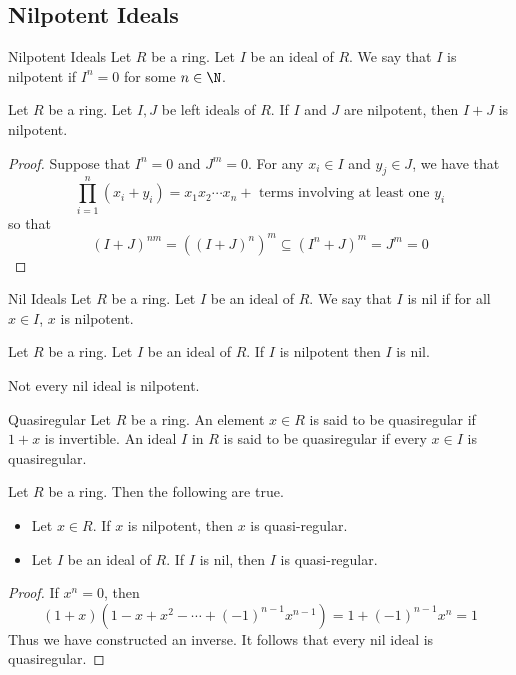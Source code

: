 \documentclass[a4paper]{article}
\begin{document}
\subsection{Nilpotent Ideals}
\begin{defn}{Nilpotent Ideals}{} Let $R$ be a ring. Let $I$ be an ideal of $R$. We say that $I$ is nilpotent if $I^n=0$ for some $n\in\N$. 
\end{defn}

\begin{prp}{}{} Let $R$ be a ring. Let $I,J$ be left ideals of $R$. If $I$ and $J$ are nilpotent, then $I+J$ is nilpotent. 
\begin{proof}
Suppose that $I^n=0$ and $J^m=0$. For any $x_i\in I$ and $y_j\in J$, we have that $$\prod_{i=1}^n(x_i+y_i)=x_1x_2\cdots x_n+\text{ terms involving at least one }y_i$$ so that $$(I+J)^{nm}=((I+J)^n)^m\subseteq(I^n+J)^m=J^m=0$$
\end{proof}
\end{prp}

\begin{defn}{Nil Ideals}{} Let $R$ be a ring. Let $I$ be an ideal of $R$. We say that $I$ is nil if for all $x\in I$, $x$ is nilpotent. 
\end{defn}

\begin{lmm}{}{} Let $R$ be a ring. Let $I$ be an ideal of $R$. If $I$ is nilpotent then $I$ is nil. 
\end{lmm}

Not every nil ideal is nilpotent. 

\begin{defn}{Quasiregular}{} Let $R$ be a ring. An element $x\in R$ is said to be quasiregular if $1+x$ is invertible. An ideal $I$ in $R$ is said to be quasiregular if every $x\in I$ is quasiregular. 
\end{defn}

\begin{lmm}{}{} Let $R$ be a ring. Then the following are true. 
\begin{itemize}
\item Let $x\in R$. If $x$ is nilpotent, then $x$ is quasi-regular. 
\item Let $I$ be an ideal of $R$. If $I$ is nil, then $I$ is quasi-regular. 
\end{itemize}
\begin{proof}
If $x^n=0$, then $$(1+x)(1-x+x^2-\cdots+(-1)^{n-1}x^{n-1})=1+(-1)^{n-1}x^n=1$$ Thus we have constructed an inverse. It follows that every nil ideal is quasiregular. 
\end{proof}
\end{lmm}
\end{document}
